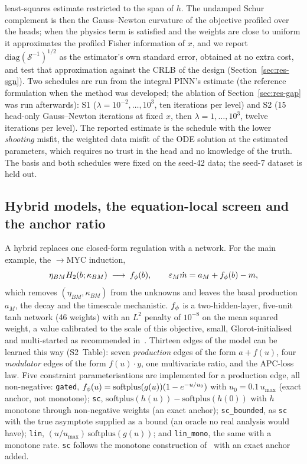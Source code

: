 least-squares estimate restricted to the span of $h$. The undamped Schur
complement is then the Gauss--Newton curvature of the objective profiled over
the heads; when the physics term is satisfied and the weights are close to
uniform it approximates the profiled Fisher information of $x$, and we report
$\mathrm{diag}(\mathcal{S}^{-1})^{1/2}$ as the estimator's own standard error,
obtained at no extra cost, and test that approximation against the CRLB of the
design (Section~\ref{sec:res-sgn}). Two schedules are run from the
integral PINN's estimate (the reference formulation when the method was
developed; the ablation of Section~\ref{sec:res-gap} was run afterwards): S1 ($\lambda=10^{-2},\dots,10^{3}$, ten iterations per
level) and S2 (15 head-only Gauss--Newton iterations at fixed $x$, then
$\lambda=1,\dots,10^{3}$, twelve iterations per level). The reported estimate is
the schedule with the lower \emph{shooting} misfit, the weighted data misfit of
the ODE solution at the estimated parameters, which requires no trust in the
head and no knowledge of the truth. The basis and both schedules were fixed on
the seed-42 data; the seed-7 dataset is held out.

\subsection{Hybrid models, the equation-local screen and the anchor ratio}
\label{sec:m-hybrid}

A hybrid replaces one closed-form regulation with a network. For the main
example, the \bcat{}$\to$MYC induction,
\begin{equation}
\eta_{BM}H_2(b;\kappa_{BM}) \;\longrightarrow\; f_{\phi}(b),
\qquad \varepsilon_M\dot m = a_M + f_{\phi}(b) - m,
\label{eq:myc-hybrid}
\end{equation}
which removes $(\eta_{BM},\kappa_{BM})$ from the unknowns and leaves the basal
production $a_M$, the decay and the timescale mechanistic. $f_{\phi}$ is a
two-hidden-layer, five-unit tanh network (46 weights) with an $L^2$ penalty of
$10^{-8}$ on the mean squared weight, a value calibrated to the scale of this
objective, small, Glorot-initialised and multi-started as recommended
in~\citep{philipps2025ude}. Thirteen edges of the model can be learned this way
(S2~Table): seven \emph{production} edges of the form $a+f(u)$, four
\emph{modulator} edges of the form $f(u)\cdot y$, one multivariate ratio, and
the APC-loss law. Five constraint parameterisations are implemented for a
production edge, all non-negative: \texttt{gated},
$f_{\phi}(u)=\mathrm{softplus}(g(u))(1-e^{-u/u_0})$ with $u_0=0.1\,u_{\max}$ (exact
anchor, not monotone); \texttt{sc}, $\mathrm{softplus}(h(u))-\mathrm{softplus}(h(0))$ with $h$
monotone through non-negative weights (an exact anchor); \texttt{sc\_bounded}, as
\texttt{sc} with the true asymptote supplied as a bound (an oracle no real
analysis would have); \texttt{lin}, $(u/u_{\max})\,\mathrm{softplus}(g(u))$; and
\texttt{lin\_mono}, the same with a monotone rate. \texttt{sc} follows the
monotone construction of~\citep{loman2025identifiability} with an exact anchor
added.


